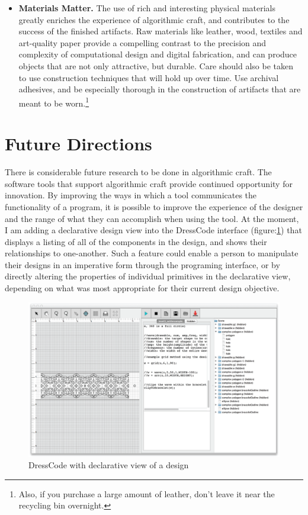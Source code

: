 \begin{itemize}
\item \textbf{Materials Matter.} The use of rich and interesting physical materials greatly enriches the experience of algorithmic craft, and contributes to the success of the finished artifacts. Raw materials like leather, wood, textiles and art-quality paper provide a compelling contrast to the precision and complexity of computational design and digital fabrication, and can produce objects that are not only attractive, but durable. Care should also be taken to use construction techniques that will hold up over time. Use archival adhesives, and be especially thorough in the construction of artifacts that are meant to be worn.\footnote{Also, if you purchase a large amount of leather, don't leave it near the recycling bin overnight.}
\end{itemize}


\section{Future Directions}

	There is considerable future research to be done in algorithmic craft. The software tools that support algorithmic craft provide continued opportunity for innovation.  By improving the ways in which a tool communicates the functionality of a program, it is possible to improve the experience of the designer and the range of what they can accomplish when using the tool. At the moment, I am adding a declarative design view into the DressCode interface (figure:\ref{fig:declarative_view}) that displays a listing of all of the components in the design, and shows their relationships to one-another. Such a feature could enable a person to manipulate their designs in an imperative form through the programing interface, or by directly altering the properties of individual primitives in the declarative view, depending on what was most appropriate for their current design objective.

 \begin{center}
\begin{figure}[h!]
\includegraphics[width=\columnwidth]{images/declarative_view.png}
\caption{DressCode with declarative view of a design}
\label{fig:declarative_view}
\end{figure}
\end{center}

